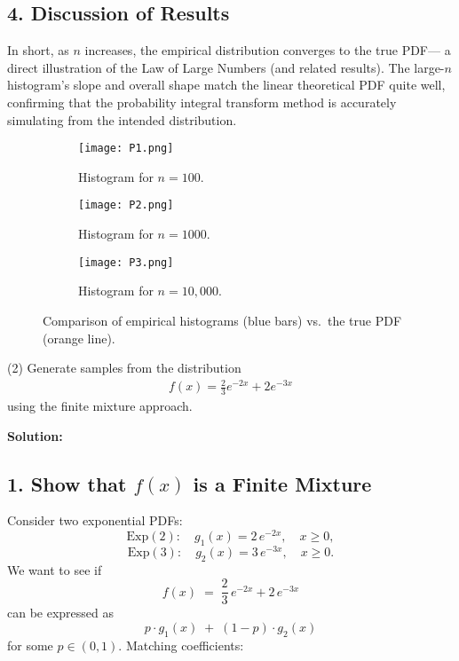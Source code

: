\documentclass[final,11pt]{article}
\begin{document}
\begin{spacing}{1.25}
{\subsection*{4. Discussion of Results}

In short, as \(n\) increases, the empirical distribution converges to the true PDF---%
a direct illustration of the Law of Large Numbers (and related results). 
The large-\(n\) histogram's slope and overall shape match the linear theoretical PDF quite well, 
confirming that the probability integral transform method is accurately simulating from 
the intended distribution.

\begin{figure}[htbp]
  \centering
  \begin{subfigure}[b]{0.31\textwidth}
    \centering
    \texttt{[image: P1.png]}
    \caption{Histogram for \(n=100\).}
  \end{subfigure}
  \hfill
  \begin{subfigure}[b]{0.31\textwidth}
    \centering
    \texttt{[image: P2.png]}
    \caption{Histogram for \(n=1000\).}
  \end{subfigure}
  \hfill
  \begin{subfigure}[b]{0.31\textwidth}
    \centering
    \texttt{[image: P3.png]}
    \caption{Histogram for \(n=10,000\).}
  \end{subfigure}
  
  \caption{Comparison of empirical histograms (blue bars) vs.\ the true PDF (orange line).}
  \label{fig:comparison}
\end{figure}


}


\newpage

(2) Generate samples from the distribution
\begin{gather}
    f(x)=\frac{2}{3}e^{-2x}+2e^{-3x}
\end{gather}
using the finite mixture approach.

{
\textbf{Solution:}

\subsection*{1. Show that $f(x)$ is a Finite Mixture}
Consider two exponential PDFs:
\[
\text{Exp}(2): \quad g_1(x) = 2\,e^{-2x}, \quad x \ge 0,
\]
\[
\text{Exp}(3): \quad g_2(x) = 3\,e^{-3x}, \quad x \ge 0.
\]
We want to see if
\[
f(x) \;=\; \frac{2}{3}\,e^{-2x} + 2\,e^{-3x}
\]
can be expressed as
\[
p \cdot g_1(x) \;+\; (1-p)\cdot g_2(x)
\]
for some $p \in (0,1)$. Matching coefficients:

}
\end{spacing}
\end{document}
